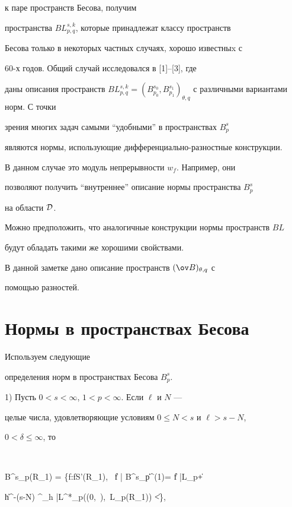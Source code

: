 к паре пространств Бесова, получим


пространства $B L^{s,k}_{p,q}$, которые принадлежат классу пространств


Бесова только в некоторых частных случаях, хорошо известныx с


60-х годов. Общий случай исследовался в [1]--[3], где


даны описания пространств $B L^{s,k}_{p,q}=(B^{s_0}_{p_0},


B^{s_1}_{p_1})_{\theta,q}$ с различными вариантами норм. С точки


зрения многих задач самыми ``удобными'' в пространствах $B^s_p$


являются нормы, использующие дифференциально-разностные конструкции.


В данном случае это модуль непрерывности $w_f$. Например, они


позволяют получить ``внутреннее'' описание нормы пространства $B^s_p$


на области $\cal D$.


Можно предположить, что аналогичные конструкции нормы пространств $B L$


будут обладать такими же хорошими свойствами.


В данной заметке дано описание пространств $(\ov B )_{\theta,q}$ с


помощью разностей.





\section{Нормы в пространствах Бесова}





Используем следующие


определения норм в пространствах Бесова $B^s_p$.





1) Пусть $0<s<\infty$, $1<p< \infty$. Если $\ell $ и $N$ ---


целые числа, удовлетворяющие условиям $0\le N <s $ и $\ell >s-N$,


$0<\delta \le \infty$, то


$$


B^s_p(R_1) = \bigg\{f:f\in S'(R_1), \ \|f | B^s_p\|^{(1)}= \|f |L_p\| +


\bigg\|h^{-(s-N)} \cdot \Delta^{\ell}_h \; |L^*_p((0,\, \delta ),\, L_p(R_1)) \bigg\| <\infty \bigg\},


